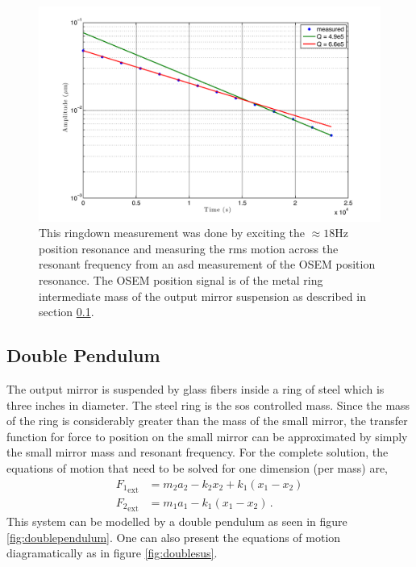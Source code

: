 \begin{figure}[hb]
\centering
\includegraphics[width=15cm]{./figures/Qmeasurement.pdf}
\caption[Q Measurement of Glass Suspension]{
    This ringdown measurement was done by exciting the $\approx 18\mathrm{Hz}$
    position resonance and measuring the rms motion across the resonant
    frequency from an \ac{asd} measurement of the OSEM position resonance.
    The OSEM position signal is of the metal ring intermediate mass of the
    output mirror suspension as described in section \ref{sec:doublepend}.
    }
\label{fig:Qmeasurement}
\end{figure}

\subsection{Double Pendulum}
\label{sec:doublepend}
The output mirror is suspended by glass fibers inside a ring of steel which is
three inches in diameter. The steel ring is the \ac{sos} controlled mass.
Since the mass of the ring is considerably greater than the mass of the small
mirror, the transfer function for force to position on the small mirror can be
approximated by simply the small mirror mass and resonant frequency.
For the complete solution, the equations of motion that need to be solved for
one dimension (per mass) are,
\begin{align}
{F_1}_{\mathrm{ext}} &= m_2a_2-k_2x_2+k_1\left(x_1-x_2\right) \\
{F_2}_{\mathrm{ext}} &= m_1a_1-k_1\left(x_1-x_2\right) \, .
\end{align}
This system can be modelled by a double pendulum as seen in figure
\ref{fig:doublependulum}.
One can also present the equations of motion diagramatically as in figure
\ref{fig:doublesus}.


